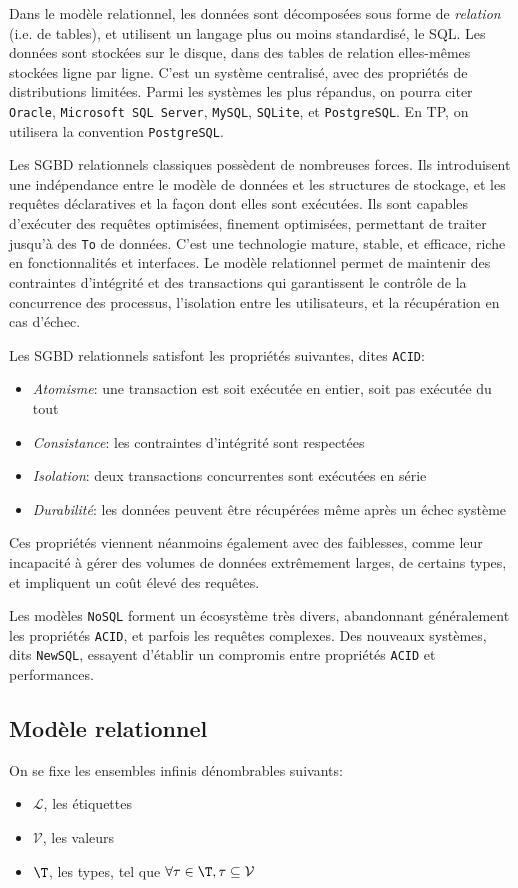 \documentclass[french, toc]{../cs-classes/cs-classes}
\renewcommand*{\L}{\mathcal{L}}
\newcommand*{\V}{\mathcal{V}}
\begin{document}
Dans le modèle relationnel, les données sont décomposées sous forme de \emph{relation} (i.e. de tables), et utilisent un langage plus ou moins standardisé, le SQL. Les données sont stockées sur le disque, dans des tables de relation elles-mêmes stockées ligne par ligne. C'est un système centralisé, avec des propriétés de distributions limitées. Parmi les systèmes les plus répandus, on pourra citer \texttt{Oracle}, \texttt{Microsoft SQL Server}, \texttt{MySQL}, \texttt{SQLite}, et \texttt{PostgreSQL}. En TP, on utilisera la convention \texttt{PostgreSQL}.

Les SGBD relationnels classiques possèdent de nombreuses forces. Ils introduisent une indépendance entre le modèle de données et les structures de stockage, et les requêtes déclaratives et la façon dont elles sont exécutées. Ils sont capables d'exécuter des requêtes optimisées, finement optimisées, permettant de traiter jusqu'à des \texttt{To} de données. C'est une technologie mature, stable, et efficace, riche en fonctionnalités et interfaces. Le modèle relationnel permet de maintenir des contraintes d'intégrité et des transactions qui garantissent le contrôle de la concurrence des processus, l'isolation entre les utilisateurs, et la récupération en cas d'échec.

Les SGBD relationnels satisfont les propriétés suivantes, dites \texttt{ACID}:
\begin{itemize}
    \item \emph{Atomisme}: une transaction est soit exécutée en entier, soit pas exécutée du tout
    \item \emph{Consistance}: les contraintes d'intégrité sont respectées
    \item \emph{Isolation}: deux transactions concurrentes sont exécutées en série
    \item \emph{Durabilité}: les données peuvent être récupérées même après un échec système
\end{itemize}
Ces propriétés viennent néanmoins également avec des faiblesses, comme leur incapacité à gérer des volumes de données extrêmement larges, de certains types, et impliquent un coût élevé des requêtes.

Les modèles \texttt{NoSQL} forment un écosystème très divers, abandonnant généralement les propriétés \texttt{ACID}, et parfois les requêtes complexes. Des nouveaux systèmes, dits \texttt{NewSQL}, essayent d'établir un compromis entre propriétés \texttt{ACID} et performances.

\subsection{Modèle relationnel}
On se fixe les ensembles infinis dénombrables suivants:
\begin{itemize}
    \item $\L$, les étiquettes
    \item $\V$, les valeurs
    \item $\T$, les types, tel que $\forall\tau\in\T, \tau\subseteq\V$
\end{itemize}
\end{document}

